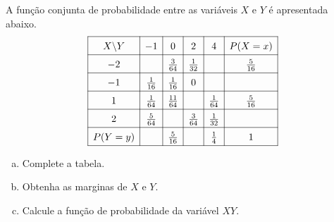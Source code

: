 %
%


\begin{exercicioBanco}[\valorquestao]
    A função conjunta de probabilidade entre as variáveis \(X\) e \(Y\) é apresentada abaixo.
    \[
    \renewcommand{\arraystretch}{1.5}
    \begin{array}{|c|c|c|c|c|c|}
        \hline
        X\backslash Y & -1 & 0 & 2 & 4 & P(X = x) \\
        \hline
        -2 &  & \frac{3}{64} & \frac{1}{32} &  & \frac{5}{16} \\
        \hline
        -1 & \frac{1}{16} & \frac{1}{16} & 0 &  &  \\
        \hline
        1 & \frac{1}{64} & \frac{11}{64} &  & \frac{1}{64} & \frac{5}{16} \\
        \hline
        2 & \frac{5}{64} &  & \frac{3}{64} & \frac{1}{32} &  \\
        \hline
        P(Y = y) &  & \frac{5}{16} &  & \frac{1}{4} & 1 \\
        \hline
    \end{array}
    \]
    \begin{enumerate}[(a)]
        \item Complete a tabela.
        \item Obtenha as marginas de \(X\) e \(Y\).
        \item Calcule a função de probabilidade da variável \(XY\).
    \end{enumerate}
\end{exercicioBanco}

